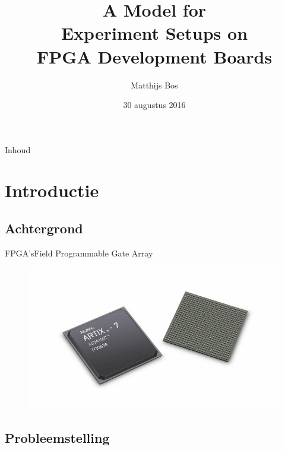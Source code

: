\documentclass{beamer}
\title{A Model for \\Experiment Setups on \\FPGA Development Boards}
\author{Matthijs Bos}
\institute[Universities of Somewhere and Elsewhere] %
{
  BSc Informatica\\
  Universiteit van Amsterdam (UvA)\\
  \vspace{1.5em}
  Begeleiders:\\
  \vspace{0.3em}
  A. van Inge\\
  T. Walstra}
\date{30 augustus 2016}
\begin{document}
\begin{frame}
\let\thefootnote\relax
  \titlepage
\end{frame}

\begin{frame}{Inhoud}
  \tableofcontents
\end{frame}

\section{Introductie}

\subsection{Achtergrond}

\begin{frame}{FPGA's}{Field Programmable Gate Array}
    
    \begin{figure}
        \centering
        \includegraphics[width=\textwidth]{img/artix7}
    \end{figure}
\end{frame}

\subsection{Probleemstelling}
\end{document}
